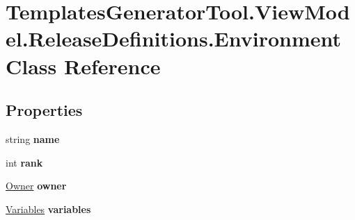 \hypertarget{class_templates_generator_tool_1_1_view_model_1_1_release_definitions_1_1_environment}{}\section{Templates\+Generator\+Tool.\+View\+Model.\+Release\+Definitions.\+Environment Class Reference}
\label{class_templates_generator_tool_1_1_view_model_1_1_release_definitions_1_1_environment}
\subsection*{Properties}
\begin{DoxyCompactItemize}
\item 
\mbox{\label{class_templates_generator_tool_1_1_view_model_1_1_release_definitions_1_1_environment_ae9dd3ffa6cb630e25afda87f8213f39f}} 
string {\bfseries name}
\item 
\mbox{\label{class_templates_generator_tool_1_1_view_model_1_1_release_definitions_1_1_environment_a3f194681d12e4d0a9835634976bf5f49}} 
int {\bfseries rank}
\item 
\mbox{\label{class_templates_generator_tool_1_1_view_model_1_1_release_definitions_1_1_environment_a879f40472717497cec0c675313cd3566}} 
\mbox{\hyperlink{class_templates_generator_tool_1_1_view_model_1_1_release_definitions_1_1_owner}{Owner}} {\bfseries owner}
\item 
\mbox{\label{class_templates_generator_tool_1_1_view_model_1_1_release_definitions_1_1_environment_a71cb71a6f9494235c90b85687334059c}} 
\mbox{\hyperlink{class_templates_generator_tool_1_1_view_model_1_1_release_definitions_1_1_variables}{Variables}} {\bfseries variables}

\end{DoxyCompactItemize}
